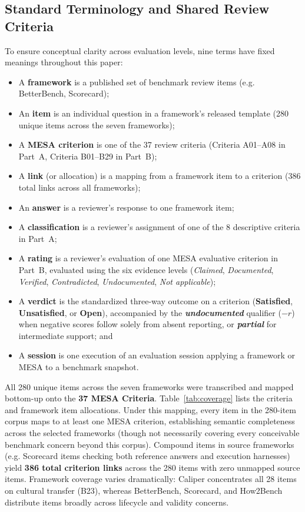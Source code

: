 \documentclass[runningheads]{llncs}
\begin{document}
\subsection{Standard Terminology and Shared Review Criteria}
To ensure conceptual clarity across evaluation levels, nine terms have fixed meanings throughout this paper:
\begin{itemize}[leftmargin=*]
    \item A \textbf{framework} is a published set of benchmark review items (e.g. BetterBench, Scorecard);
    \item An \textbf{item} is an individual question in a framework's released template (280 unique items across the seven frameworks);
    \item A \textbf{MESA criterion} is one of the 37 review criteria (Criteria A01--A08 in Part~A, Criteria B01--B29 in Part~B);
    \item A \textbf{link} (or allocation) is a mapping from a framework item to a criterion (386 total links across all frameworks);
    \item An \textbf{answer} is a reviewer's response to one framework item;
    \item A \textbf{classification} is a reviewer's assignment of one of the 8 descriptive criteria in Part~A;
    \item A \textbf{rating} is a reviewer's evaluation of one MESA evaluative criterion in Part~B, evaluated using the six evidence levels (\emph{Claimed}, \emph{Documented}, \emph{Verified}, \emph{Contradicted}, \emph{Undocumented}, \emph{Not applicable});
    \item A \textbf{verdict} is the standardized three-way outcome on a criterion (\textbf{Satisfied}, \textbf{Unsatisfied}, or \textbf{Open}), accompanied by the \textbf{\emph{undocumented}} qualifier ($-r$) when negative scores follow solely from absent reporting, or \textbf{\emph{partial}} for intermediate support; and
    \item A \textbf{session} is one execution of an evaluation session applying a framework or MESA to a benchmark snapshot.
\end{itemize}

All 280 unique items across the seven frameworks were transcribed and mapped bottom-up onto the \textbf{37 MESA Criteria}. Table~\ref{tab:coverage} lists the criteria and framework item allocations. Under this mapping, every item in the 280-item corpus maps to at least one MESA criterion, establishing semantic completeness across the selected frameworks (though not necessarily covering every conceivable benchmark concern beyond this corpus). Compound items in source frameworks (e.g. Scorecard items checking both reference answers and execution harnesses) yield \textbf{386 total criterion links} across the 280 items with zero unmapped source items. Framework coverage varies dramatically: Caliper concentrates all 28 items on cultural transfer (B23), whereas BetterBench, Scorecard, and How2Bench distribute items broadly across lifecycle and validity concerns.
\end{document}
